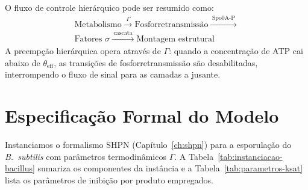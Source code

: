 O fluxo de controle hierárquico pode ser resumido como:
\begin{multline}
\text{Metabolismo}
\xrightarrow{\;\Gamma\;}
\text{Fosforretransmissão}
\xrightarrow{\;\text{Spo0A-P}\;} \\
\text{Fatores } \sigma
\xrightarrow{\;\text{cascata}\;}
\text{Montagem estrutural}
\end{multline}
A preempção hierárquica opera através de $\Gamma$: quando a concentração
de ATP cai abaixo de $\theta_{\text{eff}}$, as transições de
fosforretransmissão são desabilitadas, interrompendo o fluxo de sinal para
as camadas a jusante.

\section{Especificação Formal do Modelo}
\label{sec:especificacao-formal}

Instanciamos o formalismo SHPN
(Capítulo~\ref{ch:shpn}) para a esporulação do \textit{B.~subtilis}
com parâmetros termodinâmicos $\Gamma$.
A Tabela~\ref{tab:instanciacao-bacillus} sumariza os componentes da
instância e a Tabela~\ref{tab:parametros-ksat} lista os parâmetros de
inibição por produto empregados.

